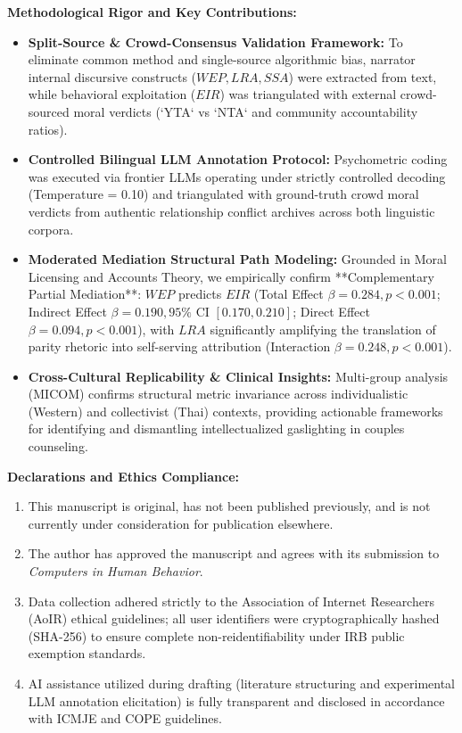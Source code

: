 \documentclass[11pt,a4paper]{article}
\begin{document}
\vspace{1.5ex}
\noindent \textbf{Methodological Rigor and Key Contributions:}
\begin{itemize}
    \item \textbf{Split-Source \& Crowd-Consensus Validation Framework:} To eliminate common method and single-source algorithmic bias, narrator internal discursive constructs ($WEP, LRA, SSA$) were extracted from text, while behavioral exploitation ($EIR$) was triangulated with external crowd-sourced moral verdicts (`YTA` vs `NTA` and community accountability ratios).
    \item \textbf{Controlled Bilingual LLM Annotation Protocol:} Psychometric coding was executed via frontier LLMs operating under strictly controlled decoding (Temperature = 0.10) and triangulated with ground-truth crowd moral verdicts from authentic relationship conflict archives across both linguistic corpora.
    \item \textbf{Moderated Mediation Structural Path Modeling:} Grounded in Moral Licensing and Accounts Theory, we empirically confirm **Complementary Partial Mediation**: $WEP$ predicts $EIR$ (Total Effect $\beta = 0.284, p < 0.001$; Indirect Effect $\beta = 0.190, 95\%$ CI $[0.170, 0.210]$; Direct Effect $\beta = 0.094, p < 0.001$), with $LRA$ significantly amplifying the translation of parity rhetoric into self-serving attribution (Interaction $\beta = 0.248, p < 0.001$).
    \item \textbf{Cross-Cultural Replicability \& Clinical Insights:} Multi-group analysis (MICOM) confirms structural metric invariance across individualistic (Western) and collectivist (Thai) contexts, providing actionable frameworks for identifying and dismantling intellectualized gaslighting in couples counseling.
\end{itemize}

\vspace{1.5ex}
\noindent \textbf{Declarations and Ethics Compliance:}
\begin{enumerate}
    \item This manuscript is original, has not been published previously, and is not currently under consideration for publication elsewhere.
    \item The author has approved the manuscript and agrees with its submission to \textit{Computers in Human Behavior}.
    \item Data collection adhered strictly to the Association of Internet Researchers (AoIR) ethical guidelines; all user identifiers were cryptographically hashed (SHA-256) to ensure complete non-reidentifiability under IRB public exemption standards.
    \item AI assistance utilized during drafting (literature structuring and experimental LLM annotation elicitation) is fully transparent and disclosed in accordance with ICMJE and COPE guidelines.
\end{enumerate}
\end{document}
